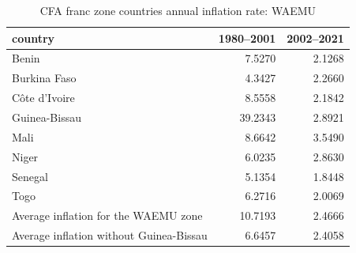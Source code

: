 \begin{table}

\caption{CFA franc zone countries annual inflation rate: WAEMU}
\centering
\begin{tabular}[t]{lrr}
\toprule
country & 1980--2001 & 2002--2021\\
\midrule
Benin & 7.5270 & 2.1268\\
Burkina Faso & 4.3427 & 2.2660\\
Côte d'Ivoire & 8.5558 & 2.1842\\
Guinea-Bissau & 39.2343 & 2.8921\\
Mali & 8.6642 & 3.5490\\
\addlinespace
Niger & 6.0235 & 2.8630\\
Senegal & 5.1354 & 1.8448\\
Togo & 6.2716 & 2.0069\\
Average inflation for the WAEMU zone & 10.7193 & 2.4666\\
Average inflation without Guinea-Bissau & 6.6457 & 2.4058\\
\bottomrule
\end{tabular}
\end{table}